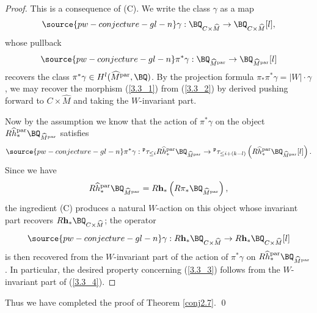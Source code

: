 \begin{proof}
    This is a consequence of (C). We write the class $\gamma$ as a map
    \begin{equation}\label{3.3_1}
\source{pw-conjecture-gl-n}
\gamma: \BQ_{C\times \widehat{M}} \to \BQ_{C\times \widehat{M}}[l],
\end{equation}
whose pullback
\begin{equation}\label{3.3_2}
\source{pw-conjecture-gl-n}
\pi^*\gamma: \BQ_{\widehat{M}^{\mathrm{par}}} \to  \BQ_{\widehat{M}^{\mathrm{par}}}[l]
\end{equation}
recovers the class $\pi^*\gamma \in H^l(\widehat{M}^{\mathrm{par}}, \BQ)$. By the projection formula $\pi_*\pi^*\gamma = |W|\cdot \gamma$, we may recover the morphism (\ref{3.3_1}) from (\ref{3.3_2}) by derived pushing forward to $C \times \widehat{M}$ and taking the $W$-invariant part.

Now by the assumption we know that the action of $\pi^*\gamma$ on the object $R\widehat{h}^{\mathrm{par}}_*\BQ_{\widehat{M}^{\mathrm{par}}}$ satisfies
\begin{equation}\label{3.3_4}
\source{pw-conjecture-gl-n}
\pi^*\gamma: {^\mathfrak{p}\tau_{\leq i}}R\widehat{h}^{\mathrm{par}}_*\BQ_{\widehat{M}^{\mathrm{par}}} \to {^\mathfrak{p}\tau_{\leq i+(k-l)}}\left(R\widehat{h}^{\mathrm{par}}_*\BQ_{\widehat{M}^{\mathrm{par}}}[l]\right).
\end{equation}
Since we have
\[
R\widehat{h}^{\mathrm{par}}_*\BQ_{\widehat{M}^{\mathrm{par}}} = R\mathbf{h}_*\left(R\pi_* \BQ_{\widehat{M}^{\mathrm{par}}}\right),
\]
the ingredient (C) produces a natural $W$-action on this object whose invariant part recovers $R\mathbf{h}_*\BQ_{C\times \widehat{M}}$; the operator
\begin{equation}\label{3.3_3}
\source{pw-conjecture-gl-n}
\gamma:  R\mathbf{h}_*\BQ_{C\times \widehat{M}} \to R\mathbf{h}_*\BQ_{C\times \widehat{M}}[l]
\end{equation}
is then recovered from the $W$-invariant part of the action of $\pi^*\gamma$ on $R\widehat{h}^{\mathrm{par}}_*\BQ_{\widehat{M}^{\mathrm{par}}}$. In particular, the desired property concerning (\ref{3.3_3}) follows from the $W$-invariant part of (\ref{3.3_4}).
\end{proof}




Thus we have completed the proof of Theorem \ref{conj2.7}. \qed
